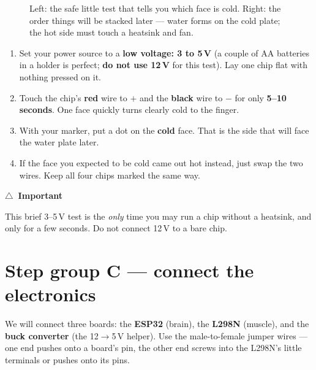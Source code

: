 \documentclass[11pt,a4paper]{article}
\newcommand{\warn}{\textcolor{orange!80!black}{$\triangle$}}
\newenvironment{checkbox}[1]
  {\par\medskip\noindent\begin{lrbox}{\gbbox}\begin{minipage}{0.95\linewidth}\footnotesize\textbf{#1}\par\smallskip}
  {\end{minipage}\end{lrbox}\setlength{\fboxsep}{8pt}\fcolorbox{red!60!black}{red!5}{\usebox{\gbbox}}\par\medskip}
\begin{document}
\begin{figure}[h]
\caption{Left: the safe little test that tells you which face is cold. Right: the order things will be
stacked later --- water forms on the cold plate; the hot side must touch a heatsink and fan.}
\end{figure}

\begin{enumerate}[leftmargin=*,itemsep=2pt]
  \item Set your power source to a \textbf{low voltage: 3 to 5\,V} (a couple of AA batteries in a holder
  is perfect; \textbf{do not use 12\,V} for this test). Lay one chip flat with nothing pressed on it.
  \item Touch the chip's \textbf{red} wire to $+$ and the \textbf{black} wire to $-$ for only
  \textbf{5--10 seconds}. One face quickly turns clearly cold to the finger.
  \item With your marker, put a dot on the \textbf{cold} face. That is the side that will face the water
  plate later.
  \item If the face you expected to be cold came out hot instead, just swap the two wires. Keep all four
  chips marked the same way.
\end{enumerate}

\begin{checkbox}{\warn\ Important}
This brief 3--5\,V test is the \emph{only} time you may run a chip without a heatsink, and only for a few
seconds. Do not connect 12\,V to a bare chip.
\end{checkbox}

\section{Step group C --- connect the electronics}

We will connect three boards: the \textbf{ESP32} (brain), the \textbf{L298N} (muscle), and the
\textbf{buck converter} (the 12$\to$5\,V helper). Use the male-to-female jumper wires --- one end pushes
onto a board's pin, the other end screws into the L298N's little terminals or pushes onto its pins.
\end{document}
